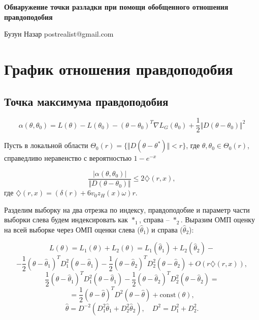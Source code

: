 

\setcounter{tocdepth}{2}

  
    

\begin{center}
\begin{huge}
\textbf{Обнаружение точки разладки при помощи обобщенного отношения правдоподобия \\}
\end{huge}
$ $ \\  
{\Large Бузун Назар postrealist@gmail.com }
\end{center}
   
    \tableofcontents 
    
  \section{График отношения правдоподобия}
  
  \subsection{Точка максимума правдоподобия}
  
  \[
  \alpha(\theta, \theta_0) = L(\theta) - L(\theta_0)   - (\theta - \theta_0)^T \nabla L_G( \theta_0) + \frac{1}{2} \Vert D (\theta - \theta_0) \Vert^2 
  \]
  
 Пусть в локальной области $\Theta_0(r) = \{\Vert D (\theta - \theta^*) \Vert < r \}$, где $\theta, \theta_0 \in \Theta_0(r)$, справедливо неравенство с вероятностью $1 - e^{-x}$ 
  
 \[\tag{a}
\frac{| \alpha(\theta, \theta_0)  |}{\Vert D(\theta - \theta_0) \Vert} \leq 2 \diamondsuit (r, x),  
  \]
 где $\diamondsuit (r, x) = (\delta (r) + 6 v_0 z_H(x) \omega ) r.$
    
Разделим выборку на два отрезка по индексу, правдоподобие и параметр части выборки слева будем индексировать  как $*_{1}$, справа  -- $*_{2}$. Выразим ОМП оценку на всей выборке через ОМП оценки слева ($\widehat{\theta}_1$) и справа ($\widehat{\theta}_2$):

\[
L(\theta) = L_1(\theta) + L_2(\theta) = L_1(\widehat{\theta}_1) + L_2(\widehat{\theta}_2) - 
\]
\[ -  \frac{1}{2} (\theta - \widehat{\theta}_1)^T D_1^2  (\theta - \widehat{\theta}_1)
-  \frac{1}{2} (\theta - \widehat{\theta}_2)^T D_2^2  (\theta - \widehat{\theta}_2) + O(r \diamondsuit (r, x)), 
\]     
\[
\frac{1}{2} (\theta - \widehat{\theta}_1)^T D_1^2  (\theta - \widehat{\theta}_1)
-  \frac{1}{2} (\theta - \widehat{\theta}_2)^T D_2^2  (\theta - \widehat{\theta}_2) 
 = 
\]
\[
 = \frac{1}{2} (\theta - \widehat{\theta})^T D^2  (\theta - \widehat{\theta}) + \text{const}(\theta),
\]
\[
\widehat{\theta} = D^{-2} (D_1^2 \widehat{\theta}_1 + D_2^2 \widehat{\theta}_2 ),
\quad D^2 = D_1^2 + D_2^2.
\]    

